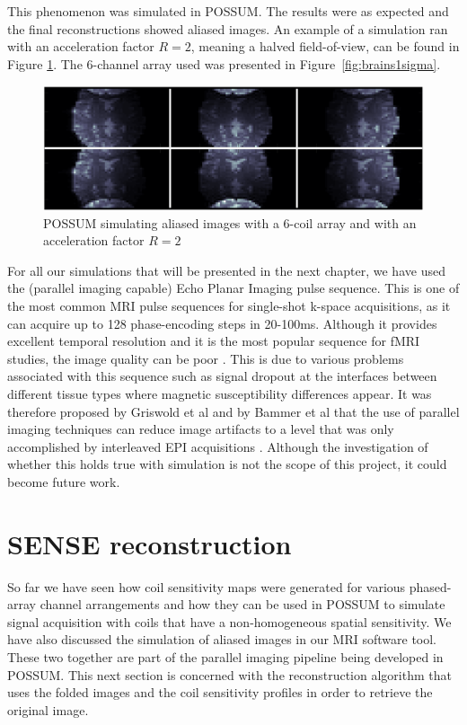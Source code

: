 This phenomenon was simulated in POSSUM. The results were as expected and the final reconstructions showed aliased images. An example of a simulation ran with an acceleration factor $R = 2$, meaning a halved field-of-view, can be found in Figure \ref{fig:figaliased}. The 6-channel array used was presented in Figure~\ref{fig:brains1sigma}.

\begin{figure}[H]
    \centering
    \includegraphics[width=1\textwidth,keepaspectratio]{figaliased}
    \caption{POSSUM simulating aliased images with a 6-coil array and with an acceleration factor $R = 2$}
    \label{fig:figaliased}
\end{figure}

For all our simulations that will be presented in the next chapter, we have used the (parallel imaging capable) Echo Planar Imaging pulse sequence. This is one of the most common MRI pulse sequences for single-shot k-space acquisitions, as it can acquire up to 128 phase-encoding steps in 20-100ms. Although it provides excellent temporal resolution and it is the most popular sequence for fMRI studies, the image quality can be poor \cite{Farzaneh1990}. This is due to various problems associated with this sequence such as signal dropout at the interfaces between different tissue types where magnetic susceptibility differences appear. It was therefore proposed by Griswold et al \cite{Griswold1999} and by Bammer et al \cite{Bammer2001} that the use of parallel imaging techniques can reduce image artifacts to a level that was only accomplished by interleaved EPI acquisitions \cite{Schmiedeskamp2010}. Although the investigation of whether this holds true with simulation is not the scope of this project, it could become future work.

\section{SENSE reconstruction}
\label{ch4sectionsense}
So far we have seen how coil sensitivity maps were generated for various phased-array channel arrangements and how they can be used in POSSUM to simulate signal acquisition with coils that have a non-homogeneous spatial sensitivity. We have also discussed the simulation of aliased images in our MRI software tool. These two together are part of the parallel imaging pipeline being developed in POSSUM. This next section is concerned with the reconstruction algorithm that uses the folded images and the coil sensitivity profiles in order to retrieve the original image.

